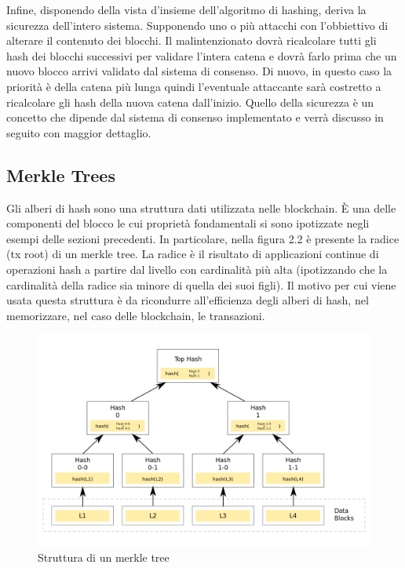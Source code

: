 Infine, disponendo della vista d'insieme dell'algoritmo di hashing, deriva la sicurezza dell'intero sistema. Supponendo uno o più attacchi con l'obbiettivo di alterare il contenuto dei blocchi. Il malintenzionato dovrà ricalcolare tutti gli hash dei blocchi successivi per validare l'intera catena e dovrà farlo prima che un nuovo blocco arrivi validato dal sistema di consenso. Di nuovo, in questo caso la priorità è della catena più lunga quindi l’eventuale attaccante sarà costretto a ricalcolare gli hash della nuova catena dall’inizio. Quello della sicurezza è un concetto che dipende dal sistema di consenso implementato e verrà discusso in seguito con maggior dettaglio.

\subsection{Merkle Trees}

Gli alberi di hash sono una struttura dati utilizzata nelle blockchain. È una delle componenti del blocco le cui proprietà fondamentali si sono ipotizzate negli esempi delle sezioni precedenti. In particolare, nella figura 2.2 è presente la radice (tx root) di un merkle tree. La radice è il risultato di applicazioni continue di operazioni hash a partire dal livello con cardinalità più alta (ipotizzando che la cardinalità della radice sia minore di quella dei suoi figli). Il motivo per cui viene usata questa struttura è da ricondurre all'efficienza degli alberi di hash, nel memorizzare, nel caso delle blockchain, le transazioni. 


\begin{figure}[H]
\centering
\includegraphics[width=1\textwidth]{immagini/hash_Trees.png}
\caption{Struttura di un merkle tree}
\label{fig:mesh3}

\end{figure}

